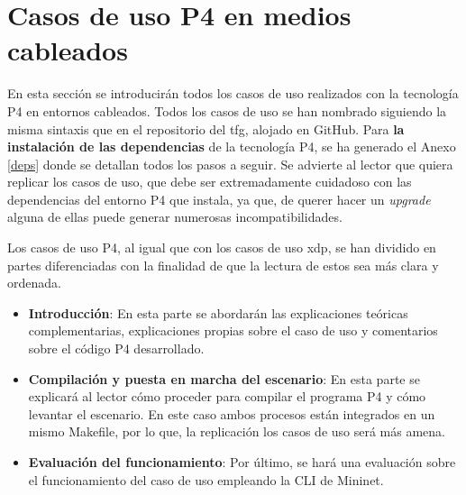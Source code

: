 
\section{Casos de uso P4 en medios cableados}

En esta sección se introducirán todos los casos de uso realizados con la tecnología P4 en entornos cableados. Todos los casos de uso se han nombrado siguiendo la misma sintaxis que en el repositorio del \gls{tfg}, alojado en GitHub. Para \textbf{la instalación de las dependencias} de la tecnología P4, se ha generado el Anexo \ref{deps} donde se detallan todos los pasos a seguir. Se advierte al lector que quiera replicar los casos de uso, que  debe ser extremadamente cuidadoso con las dependencias del entorno P4 que instala, ya que, de querer hacer un \textit{upgrade} alguna de ellas puede generar numerosas incompatibilidades. \\
\par

Los casos de uso P4, al igual que con los casos de uso \gls{xdp}, se han dividido en partes diferenciadas con la finalidad de que la lectura de estos sea más clara y ordenada.

\begin{itemize}
    \item \textbf{Introducción}: En esta parte se abordarán las explicaciones teóricas complementarias, explicaciones propias sobre el caso de uso y comentarios sobre el código P4 desarrollado.
    
    \item \textbf{Compilación y puesta en marcha del escenario}: En esta parte se explicará al lector cómo proceder para compilar el programa P4 y cómo levantar el escenario. En este caso ambos procesos están integrados en un mismo Makefile, por lo que, la replicación los casos de uso será más amena.
    
    \item \textbf{Evaluación del funcionamiento}: Por último, se hará una evaluación sobre el funcionamiento del caso de uso empleando la CLI de Mininet.
\end{itemize}

